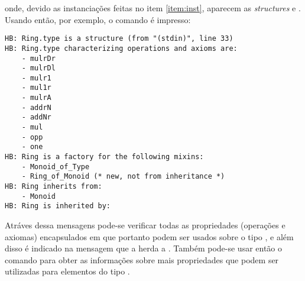 {{\begin{enumerate}
        onde, devido as instanciações feitas no item \ref{item:inst}, aparecem as \textit{structures}  e . Usando então, por exemplo, o comando  é impresso:
            \begin{lstlisting}[language=coq-error, frame=single, tabsize=1]
HB: Ring.type is a structure (from "(stdin)", line 33)
HB: Ring.type characterizing operations and axioms are:
    - mulrDr
    - mulrDl
    - mulr1
    - mul1r
    - mulrA
    - addrN
    - addNr
    - mul
    - opp
    - one
HB: Ring is a factory for the following mixins:
    - Monoid_of_Type
    - Ring_of_Monoid (* new, not from inheritance *)
HB: Ring inherits from:
    - Monoid
HB: Ring is inherited by:
            \end{lstlisting}
    Atráves dessa mensagens pode-se verificar todas as propriedades (operações e axiomas) encapsulados em  que portanto podem ser usados sobre o tipo , e além disso é indicado na mensagem que a   herda a  . Também pode-se usar então o comando  para obter as informações sobre mais propriedades que podem ser utilizadas para elementos do tipo .


    \end{enumerate}





    
        

}}

